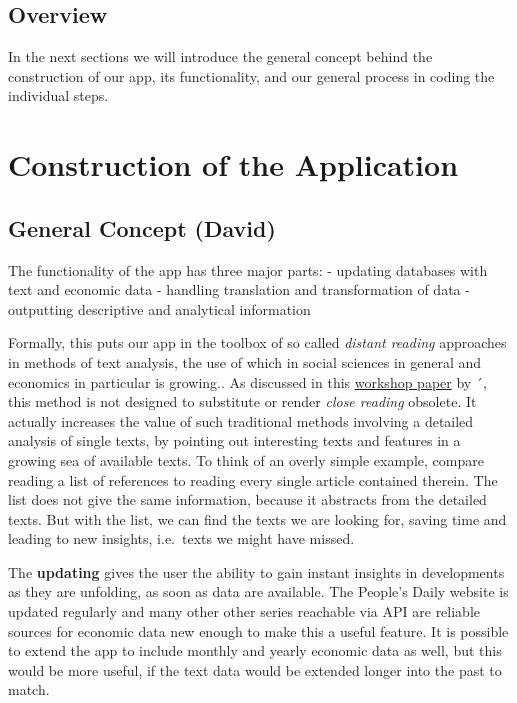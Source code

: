 \documentclass[12pt,a4paper]{article}
\begin{document}
\hypertarget{overview}{%
\subsection{Overview}\label{overview}}

In the next sections we will introduce the general concept behind the construction of our app, its functionality, and our general process in coding the individual steps.

\hypertarget{construction-of-the-application}{%
\section{Construction of the Application}\label{construction-of-the-application}}

\hypertarget{general-concept-david}{%
\subsection{General Concept (David)}\label{general-concept-david}}

The functionality of the app has three major parts:
- updating databases with text and economic data
- handling translation and transformation of data
- outputting descriptive and analytical information

Formally, this puts our app in the toolbox of so called \emph{distant reading} approaches in methods of text analysis, the use of which in social sciences in general and economics in particular is growing.. As discussed in this \href{http://ceur-ws.org/Vol-1786/scrivner.pdf}{workshop paper} by \citet{scrivner_davis2017}´, this method is not designed to substitute or render \emph{close reading} obsolete. It actually increases the value of such traditional methods involving a detailed analysis of single texts, by pointing out interesting texts and features in a growing sea of available texts. To think of an overly simple example, compare reading a list of references to reading every single article contained therein. The list does not give the same information, because it abstracts from the detailed texts. But with the list, we can find the texts we are looking for, saving time and leading to new insights, i.e.~texts we might have missed.

The \textbf{updating} gives the user the ability to gain instant insights in developments as they are unfolding, as soon as data are available. The People's Daily website is updated regularly and many other other series reachable via API are reliable sources for economic data new enough to make this a useful feature. It is possible to extend the app to include monthly and yearly economic data as well, but this would be more useful, if the text data would be extended longer into the past to match.
\end{document}
